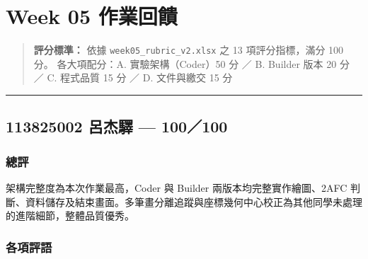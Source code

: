 \documentclass[14pt,]{extarticle}
\date{}
\begin{document}
\hypertarget{week-05-ux4f5cux696dux56deux994b}{%
\section{Week 05 作業回饋}\label{week-05-ux4f5cux696dux56deux994b}}

\begin{quote}
\textbf{評分標準：} 依據 \texttt{week05\_rubric\_v2.xlsx} 之 13
項評分指標，滿分 100 分。 各大項配分：A. 實驗架構（Coder）50 分 ／ B.
Builder 版本 20 分 ／ C. 程式品質 15 分 ／ D. 文件與繳交 15 分
\end{quote}

\begin{center}\rule{0.5\linewidth}{0.4pt}\end{center}

\hypertarget{ux5442ux6770ux9a5b-100100}{%
\subsection{113825002 呂杰驛 ---
100／100}\label{ux5442ux6770ux9a5b-100100}}

\hypertarget{ux7e3dux8a55}{%
\subsubsection{總評}\label{ux7e3dux8a55}}

架構完整度為本次作業最高，Coder 與 Builder 兩版本均完整實作繪圖、2AFC
判斷、資料儲存及結束畫面。多筆畫分離追蹤與座標幾何中心校正為其他同學未處理的進階細節，整體品質優秀。

\hypertarget{ux5404ux9805ux8a55ux8a9e}{%
\subsubsection{各項評語}\label{ux5404ux9805ux8a55ux8a9e}}
\end{document}
